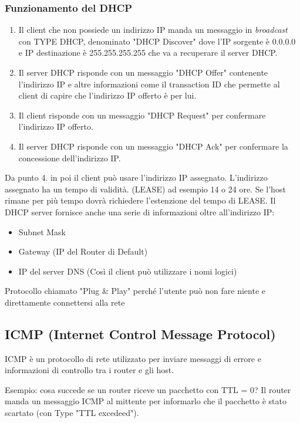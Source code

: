 \documentclass[a4paper]{article}
\begin{document}
\subsubsection{Funzionamento del DHCP}
\begin{enumerate}
  \item Il client che non possiede un indirizzo IP manda un messaggio in \textit{broadcast} con TYPE DHCP, denominato "DHCP Discover" dove l'IP sorgente è 0.0.0.0 e IP destinazione è 255.255.255.255 che va a recuperare il server DHCP.
  \item Il server DHCP risponde con un messaggio "DHCP Offer" contenente l'indirizzo IP e altre informazioni come il transaction ID che permette al client di capire che l'indirizzo IP offerto è per lui.
  \item Il client risponde con un messaggio "DHCP Request" per confermare l'indirizzo IP offerto. 
  \item Il server DHCP risponde con un messaggio "DHCP Ack" per confermare la concessione dell'indirizzo IP.
\end{enumerate}
\noindent
Da punto 4. in poi il client può usare l'indirizzo IP assegnato. L'indirizzo assegnato ha un tempo di validità. (LEASE) ad esempio
14 o 24 ore. Se l'host rimane per più tempo dovrà richiedere l'estenzione del tempo di LEASE.
Il DHCP server fornisce anche una serie di informazioni oltre all'indirizzo IP: 
\begin{itemize}
  \item Subnet Mask
  \item Gateway (IP del Router di Default)
  \item IP del server DNS (Così il client può utilizzare i nomi logici)
\end{itemize}
Protocollo chiamato "Plug \& Play" perché l'utente può non fare niente e direttamente connettersi alla rete

\subsection{ICMP (Internet Control Message Protocol)}

\begin{definition}
  ICMP è un protocollo di rete utilizzato per inviare messaggi di errore e informazioni di controllo tra i router e gli host.
\end{definition}
\noindent
Esempio: cosa succede se un router riceve un pacchetto con TTL = 0? Il router manda un messaggio ICMP al mittente per informarlo che il pacchetto è stato scartato (con Type "TTL excedeed").\\
\end{document}
